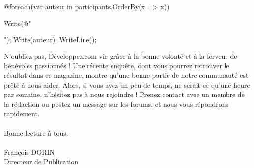 \begin{itemize}
@foreach(var auteur in participants.OrderBy(x => x))
{
	Write(@"\item ");
	Write(auteur);
	WriteLine();
}
\end{itemize}

N’oubliez pas, Développez.com vie grâce à la bonne volonté et à la ferveur de bénévoles passionnés ! Une récente enquête, dont vous pourrez retrouver le résultat dans ce magazine, montre 
qu’une bonne partie de notre communauté est prête à nous aider. Alors, si vous avez un peu de temps, ne serait-ce qu’une heure par semaine, n’hésitez pas à nous rejoindre ! Prenez contact avec
un membre de la rédaction ou postez un message sur les forums, et nous vous répondrons rapidement.

\paragraph*{}

Bonne lecture à tous.

\paragraph*{}

\begin{flushright}
François DORIN\\
Directeur de Publication
\end{flushright}
\clearpage